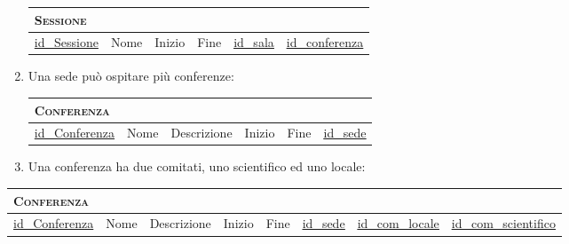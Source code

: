 \begin{enumerate}
	\begin{tabular}{|l|l|l|l|l|l|}
		\multicolumn{4}{l}{\textsc{Sessione}} \\ \hline
		\underline{id\_Sessione} & Nome & Inizio & Fine & \underline{\underline{id\_sala}}& \underline{\underline{id\_conferenza}} \\ \hline
	\end{tabular}

\item Una sede può ospitare più conferenze:

	\begin{tabular}{|l|l|l|l|l|l|}
		\multicolumn{6}{l}{\textsc{Conferenza}} \\ \hline
		\underline{id\_Conferenza} & Nome & Descrizione & Inizio & Fine & \underline{\underline{id\_sede}} \\ \hline
	\end{tabular}

\item Una conferenza ha due comitati, uno scientifico ed uno locale:

	

\end{enumerate}
\begin{tabular}{|l|l|l|l|l|l|l|l|}
	\multicolumn{6}{l}{\textsc{Conferenza}} \\ \hline
	\underline{id\_Conferenza} & Nome & Descrizione & Inizio & Fine & \underline{\underline{id\_sede}} & \underline{\underline{id\_com\_locale}}& \underline{\underline{id\_com\_scientifico}}\\ \hline
\end{tabular}
